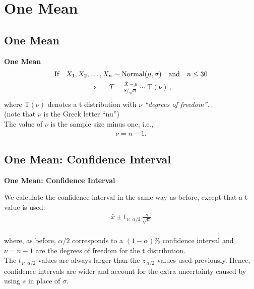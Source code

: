 \documentclass[compress]{beamer}        %
\makeatletter
\newcommand{\tcb}{\textcolor{beamer@blendedblue}}
\makeatother
\begin{document}
\section{One Mean}
\subsection{One Mean}
\begin{frame}{\bf \tcb{One Mean}}
\begin{align*}
\text{If\quad} X_1,X_2,\ldots,X_n \sim \text{Normal}(\mu, \sigma) \text{\quad and\quad}& n \le 30\\[-0.2cm]
\end{align*}
\begin{align*}
\Rightarrow\quad & \boxed{T = \frac{\,\overline{\!X} - \mu}{S/\sqrt{n}} \sim \text{T}(\nu)}\,, \\[-0.1cm]
\end{align*}
where $\text{T}(\nu)$ denotes a t distribution with $\nu$ \emph{``degrees of freedom''}.\\
{\footnotesize(note that $\nu$ is the Greek letter ``nu'')}\\[0.8cm]

The value of $\nu$ is the sample size minus one, i.e.,
\begin{align*}
\boxed{\nu = n - 1}.
\end{align*}

\end{frame}



\subsection{One Mean: Confidence Interval}
\begin{frame}{\bf \tcb{One Mean: Confidence Interval}}

We calculate the confidence interval in the same way as before, except that a t value is used:\\
\begin{align*}
\boxed{\bar x \pm t_{\,\nu,\,\alpha/2} \, \frac{s}{\sqrt{n}}}\\
\end{align*}

where, as before, $\alpha/2$ corresponds to a $(1-\alpha)\%$ confidence interval and $\nu = n-1$ are the degrees of freedom for the t distribution.\\[0.8cm]

The $t_{\,\nu,\,\alpha/2}$ values are always larger than the $z_{\,\alpha/2}$ values used previously. Hence, confidence intervals are wider and account for the extra uncertainty caused by using $s$ in place of $\sigma$.
\end{frame}
\end{document}
